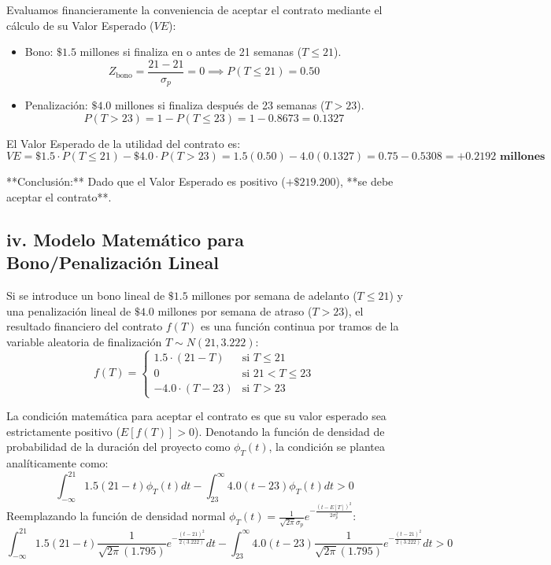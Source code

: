 \documentclass[11pt, a4paper]{article}
\begin{document}
Evaluamos financieramente la conveniencia de aceptar el contrato mediante el cálculo de su Valor Esperado ($VE$):
\begin{itemize}
  \item Bono: $\$1.5$ millones si finaliza en o antes de 21 semanas ($T \le 21$).
    \[
      Z_{\text{bono}} = \frac{21 - 21}{\sigma_p} = 0 \implies P(T \le 21) = 0.50
    \]
  \item Penalización: $\$4.0$ millones si finaliza después de 23 semanas ($T > 23$).
    \[
      P(T > 23) = 1 - P(T \le 23) = 1 - 0.8673 = 0.1327
    \]
\end{itemize}

El Valor Esperado de la utilidad del contrato es:
\[
  VE = \$1.5 \cdot P(T \le 21) - \$4.0 \cdot P(T > 23) = 1.5(0.50) - 4.0(0.1327) = 0.75 - 0.5308 = \mathbf{+0.2192 \text{ millones}}
\]

**Conclusión:** Dado que el Valor Esperado es positivo ($+\$219.200$), **se debe aceptar el contrato**.

\subsection*{iv. Modelo Matemático para Bono/Penalización Lineal}

Si se introduce un bono lineal de $\$1.5$ millones por semana de adelanto ($T \le 21$) y una penalización lineal de $\$4.0$ millones por semana de atraso ($T > 23$), el resultado financiero del contrato $f(T)$ es una función continua por tramos de la variable aleatoria de finalización $T \sim N(21, 3.222)$:
\[
  f(T) = \begin{cases}
    1.5 \cdot (21 - T) & \text{si } T \le 21 \\
    0 & \text{si } 21 < T \le 23 \\
    -4.0 \cdot (T - 23) & \text{si } T > 23
  \end{cases}
\]

La condición matemática para aceptar el contrato es que su valor esperado sea estrictamente positivo ($E[f(T)] > 0$). Denotando la función de densidad de probabilidad de la duración del proyecto como $\phi_T(t)$, la condición se plantea analíticamente como:
\[
  \int_{-\infty}^{21} 1.5(21 - t) \phi_T(t) dt - \int_{23}^{\infty} 4.0(t - 23) \phi_T(t) dt > 0
\]
Reemplazando la función de densidad normal $\phi_T(t) = \frac{1}{\sqrt{2\pi}\sigma_p} e^{-\frac{(t-E[T])^2}{2\sigma_p^2}}$:
\[
  \int_{-\infty}^{21} 1.5(21 - t) \frac{1}{\sqrt{2\pi}(1.795)} e^{-\frac{(t-21)^2}{2(3.222)}} dt - \int_{23}^{\infty} 4.0(t - 23) \frac{1}{\sqrt{2\pi}(1.795)} e^{-\frac{(t-21)^2}{2(3.222)}} dt > 0
\]
\end{document}
